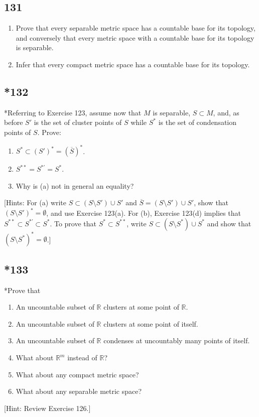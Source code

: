 \documentclass{amsart}
\begin{document}
\subsection*{131}
\begin{enumerate}[label=(\alph*)]
\item Prove that every separable metric space has a countable base for its topology, and conversely that every metric space with a countable base for its topology is separable.
\item Infer that every compact metric space has a countable base for its topology.
\end{enumerate}

\subsection*{*132}
*Referring to Exercise 123, assume now that $M$ is separable, $S \subset M$, and, as before $S'$ is the set of cluster points of $S$ while $S^*$ is the set of condensation points of $S$. Prove:
\begin{enumerate}[label=(\alph*)]
\item $S^* \subset (S')^* = (\overline{S})^*$.
\item $S^{**} = S^{*\prime} = S^*$.
\item Why is (a) not in general an equality?
\end{enumerate}
[Hints: For (a) write $S \subset (S \setminus S') \cup S'$ and $\overline{S} = (S \setminus S') \cup S'$, show that $(S \setminus S')^* = \emptyset$, and use Exercise 123(a). For (b), Exercise 123(d) implies that $S^{**} \subset S^{*\prime} \subset S^*$. To prove that $S^* \subset S^{**}$, write $S \subset (S \setminus S^*) \cup S^*$ and show that $(S \setminus S^*)^* = \emptyset$.]

\subsection*{*133}
*Prove that
\begin{enumerate}[label=(\alph*)]
\item An uncountable subset of $\mathbb{R}$ clusters at some point of $\mathbb{R}$.
\item An uncountable subset of $\mathbb{R}$ clusters at some point of itself.
\item An uncountable subset of $\mathbb{R}$ condenses at uncountably many points of itself.
\item What about $\mathbb{R}^m$ instead of $\mathbb{R}$?
\item What about any compact metric space?
\item What about any separable metric space?
\end{enumerate}
[Hint: Review Exercise 126.]
\end{document}
